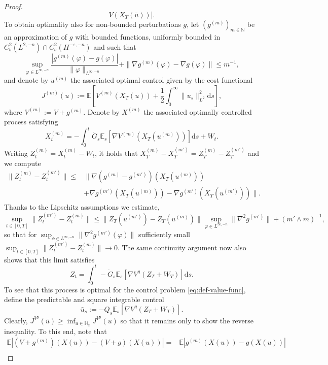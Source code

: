 \documentclass[11pt, a4paper]{scrartcl}
\numberwithin{equation}{section}
\theoremstyle{plain}
\theoremstyle{remark}
\newcommand{\assign}{:=}
\newcommand{\mathd}{\mathrm{d}}
\begin{document}
\begin{proof}
\begin{equation}
    V (X_T (\bar{u}))] . \label{eq:v-V}
  \end{equation}
  To obtain optimality also for non-bounded perturbations $g$, let
  $(g^{(m)})_{m \in \mathbb{N}}$ be an approximation of $g$ with bounded
  functions, uniformly bounded in $C^2_b(L^{2,-n})
  \cap C_b^2(H^{-\varepsilon,-n})$ and such that
  \[\sup_{\varphi \in L^{\infty, - n}} \frac{| g^{(m)} (\varphi)
  - g (\varphi) |}{\|\varphi\|_{L^{\infty, -n}}} + \| \nabla g^{(m)} (\varphi)
  - \nabla g (\varphi) \| \leqslant m^{- 1},
  \] and denote by $u^{(m)}$ the associated
  optimal control given by the cost functional
  \[ J^{(m)} (u) \assign \mathbb{E} \left[ V^{(m)} (X_T (u)) + \frac{1}{2}
     \int_0^{\infty} \| u_s \|^2_{L^2} \mathd s \right], \]
  where $V^{(m)} \assign V + g^{(m)}$. Denote by $X^{(m)}$ the associated
  optimally controlled process satisfying
  \[ X^{(m)}_t = -\int_0^t \dot{G}_s \mathbb{E}_s [\nabla V^{(m)} (X_T
     (u^{(m)}))] \mathd s + W_t . \]
  Writing $Z^{(m)}_t = X_t^{(m)} - W_t$, it holds that $X_T^{(m)}-X_T^{(m')}=Z_T^{(m)}-Z_T^{(m')}$ and we compute
  \begin{align*}
    \| Z^{(m)}_t - Z_t^{(m')} \| \leqslant &\| \nabla (g^{(m)} - g^{(m')})
     (X_T (u^{(m)})) \\
      &+ \nabla g^{(m')} (X_T (u^{(m)})) - \nabla g^{(m')} (X_T (u^{(m')})) \|. 
  \end{align*}
  Thanks to the Lipschitz assumptions we estimate,
  \[ \sup_{t \in [0, T]} \| Z^{(m')}_t - Z_t^{(m)} \| \leqslant \| Z_T
     (u^{(m')}) - Z_T (u^{(m)}) \| \sup_{\varphi \in L^{\infty, - n}} \|
     \nabla^2 g^{(m')} \| + (m' \wedge m)^{- 1}, \]
  so that for $\sup_{\phi\in L^{\infty, - n}} \| \nabla^2 g^{(m')} (\varphi) \|$
  sufficiently small $\sup_{t \in [0, T]} \| Z^{(m')}_t - Z_t^{(m)} \|
  \rightarrow 0$. The same continuity argument now also shows that this limit
  satisfies
  \[ Z_t = \int_0^t - \dot{G}_s \mathbb{E}_s [\nabla V^g (Z_T + W_T)] \mathd
     s. \]
  To see that this process is optimal for the control problem
  \eqref{eq:def-value-func}, define the predictable and square integrable
  control
  \[ \bar{u}_s \assign - Q_s \mathbb{E}_s [\nabla V^g (Z_T + W_T)] . \]
  Clearly, $J^{V^g} (\bar{u}) \geqslant \inf_{u \in \mathbb{H}_a} J^{V^g} (u)$
  so that it remains only to show the reverse inequality. To this end, note
  that
  \begin{equation*}
    \begin{aligned}
    \mathbb{E}| (V + g^{(m)}) (X (u)) - (V + g) (X  (u)) |
    =& 
    \mathbb{E}| g^{(m)} (X (u)) - g (X  (u)) |\\

\end{aligned}
\end{equation*}
\end{proof}
\end{document}
